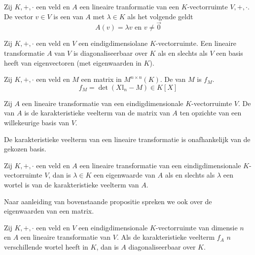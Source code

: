 \documentclass[main.tex]{subfiles}
\begin{document}
\begin{de}
  Zij $K,+,\cdot$ een veld en $A$ een lineaire tranformatie van een $K$-vectorruimte $V,+,\cdot$.
  De vector $v\in V$ is een  van $A$ met  $\lambda\in K$ als het volgende geldt
  \[ A(v) = \lambda v \text{ en } v\neq \vec{0} \]
\end{de}

\begin{ei}
  Zij $K,+,\cdot$ een veld en $V$ een eindigdimensiolane $K$-vectorruimte.
  Een lineaire transformatie $A$ van $V$ is diagonaliseerbaar over $K$ als en slechts als $V$ een basis heeft van eigenvectoren (met eigenwaarden in $K$).
\end{ei}

\begin{de}
  Zij $K,+,\cdot$ een veld en $M$ een matrix in $M^{n\times n}(K)$.
  De  van $M$ is $f_{M}$.
  \[ f_{M} = \det(X\mathbb{I}_{n} - M) \in K[X] \]
\end{de}

\begin{de}
  Zij $A$ een lineaire transformatie van een eindigdimensionale $K$-vectorruimte $V$.
  De  van $A$ is de karakteristieke veelterm van de matrix van $A$ ten opzichte van een willekeurige basis van $V$.
\end{de}

\begin{st}
  De karakteristieke veelterm van een lineaire transformatie is onafhankelijk van de gekozen basis.
\end{st}

\begin{pr}
  Zij $K,+,\cdot$ een veld en $A$ een lineaire transformatie van een eindigdimensionale $K$-vectorruimte $V$, dan is $\lambda\in K$ een eigenwaarde van $A$ als en slechts als $\lambda$ een wortel is van de karakteristieke veelterm van $A$.
\end{pr}

\begin{de}
  Naar aanleiding van bovenstaande propositie spreken we ook over de eigenwaarden van een matrix.
\end{de}

\begin{gev}
  Zij $K,+,\cdot$ een veld en $V$ een eindigdimensionale $K$-vectorruimte van dimensie $n$ en $A$ een lineaire transformatie van $V$.
  Als de karakteristieke veelterm $f_{A}$ $n$ verschillende wortel heeft in $K$, dan is $A$ diagonaliseerbaar over $K$.
\end{gev}
\end{document}
